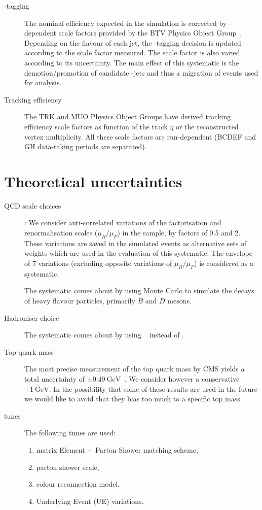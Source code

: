 \begin{description}
\item[\cPqb-tagging] The nominal efficiency expected in the simulation is corrected by \pt-dependent scale factors provided by the BTV Physics Object Group~\cite{twiki:BTV}. Depending on the flavour of each jet, the \cPqb-tagging decision is updated according to the scale factor measured. The scale factor is also varied according to its uncertainty. The main effect of this systematic is the demotion/promotion of candidate \cPqb-jets and thus a migration of events used for analysis.

\item[Tracking efficiency]
The TRK and MUO Physics Object Groups have derived tracking efficiency scale factors as function of the track $\eta$ or the reconstructed vertex multiplicity. All these scale factors are run-dependent (BCDEF and GH data-taking periods are separated).
\end{description}

\section{Theoretical uncertainties}
\begin{description}
\item[QCD scale choices]:
We consider anti-correlated variations of the factorisation and renormalisation scales ($\mu_R/\mu_F$) in the \ttbar sample, by factors of 0.5 and 2. These variations are saved in the simulated events as alternative sets of weights which are used in the evaluation of this systematic. The envelope of 7 variations (excluding opposite variations of $\mu_R/\mu_F$) is considered as a systematic.

\item[\EVTGEN] The systematic comes about by using \EVTGEN Monte Carlo to simulate the decays of heavy flavour particles, primarily $B$ and $D$ mesons. 

\item[Hadroniser choice] The systematic comes about by using \HERWIGpp~\cite{Bahr:2008pv} instead of .

\item[Top quark mass] The most precise measurement of the top quark mass by CMS yields a total uncertainty of $\pm0.49~\text{GeV}$~\cite{Khachatryan:2015hba}. We consider however a conservative $\pm1~\text{GeV}$. In the possibility that some of these results are used in the future we would like to avoid that they bias too much to a specific top mass.


\item[\PYTHIA tunes] The following \PYTHIA tunes are used:
  \begin{enumerate}
  \item matrix Element + Parton Shower matching scheme, 
  \item parton shower scale, 
  \item colour reconnection model, 
  \item Underlying Event (UE) variations. 
  \end{enumerate}
\end{description}

